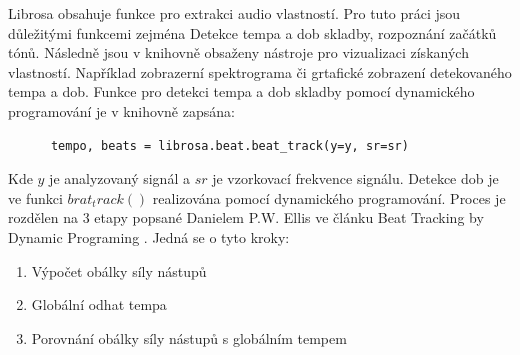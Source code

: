     Librosa obsahuje funkce pro extrakci audio vlastností.
    Pro tuto práci jsou důležitými funkcemi zejména Detekce tempa a dob skladby, rozpoznání začátků tónů. Následně jsou v knihovně obsaženy nástroje pro vizualizaci získaných vlastností. Například zobrazerní spektrograma či grtafické zobrazení detekovaného tempa a dob.
    Funkce pro detekci tempa a dob skladby pomocí dynamického programování je v knihovně zapsána:

    \begin{lstlisting}
      tempo, beats = librosa.beat.beat_track(y=y, sr=sr)
    \end{lstlisting}
    
    Kde $ y $ je analyzovaný signál a $ sr $ je vzorkovací frekvence signálu.
    Detekce dob je ve funkci $ brat_track() $ realizována pomocí dynamického programování. Proces je rozdělen na 3 etapy popsané Danielem P.W. Ellis ve článku Beat Tracking by Dynamic Programing \cite{Beat_tracking_by_dynamic_programing}. Jedná se o tyto kroky:

    \smallskip

    \begin{enumerate}
      \item Výpočet obálky síly nástupů
      \item Globální odhat tempa
      \item Porovnání obálky síly nástupů s globálním tempem
    \end{enumerate}

    \smallskip

